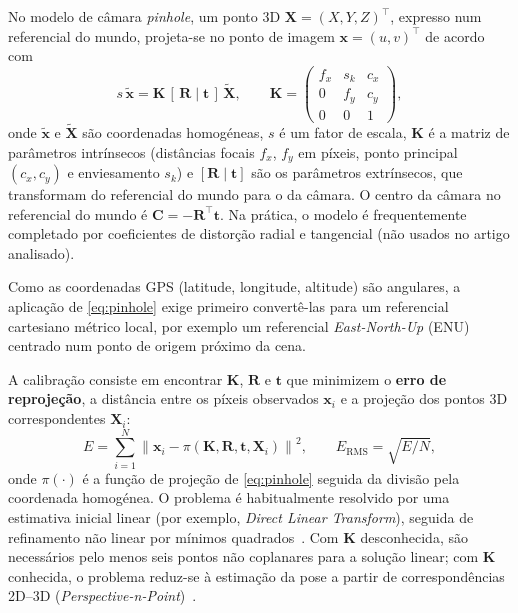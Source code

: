 No modelo de câmara \textit{pinhole}, um ponto 3D $\mathbf{X}=(X,Y,Z)^{\top}$, expresso num referencial do mundo, projeta-se no ponto de imagem $\mathbf{x}=(u,v)^{\top}$ de acordo com
\begin{equation}
    s\,\tilde{\mathbf{x}} = \mathbf{K}\,[\,\mathbf{R}\mid\mathbf{t}\,]\,\tilde{\mathbf{X}},
    \qquad
    \mathbf{K}=
    \begin{pmatrix}
        f_x & s_k & c_x\\
        0 & f_y & c_y\\
        0 & 0 & 1
    \end{pmatrix},
    \label{eq:pinhole}
\end{equation}
onde $\tilde{\mathbf{x}}$ e $\tilde{\mathbf{X}}$ são coordenadas homogéneas, $s$ é um fator de escala, $\mathbf{K}$ é a matriz de parâmetros intrínsecos (distâncias focais $f_x$, $f_y$ em píxeis, ponto principal $(c_x,c_y)$ e enviesamento $s_k$) e $[\mathbf{R}\mid\mathbf{t}]$ são os parâmetros extrínsecos, que transformam do referencial do mundo para o da câmara. O centro da câmara no referencial do mundo é $\mathbf{C}=-\mathbf{R}^{\top}\mathbf{t}$. Na prática, o modelo é frequentemente completado por coeficientes de distorção radial e tangencial (não usados no artigo analisado).

Como as coordenadas GPS (latitude, longitude, altitude) são angulares, a aplicação de \eqref{eq:pinhole} exige primeiro convertê-las para um referencial cartesiano métrico local, por exemplo um referencial \textit{East-North-Up} (ENU) centrado num ponto de origem próximo da cena.

A calibração consiste em encontrar $\mathbf{K}$, $\mathbf{R}$ e $\mathbf{t}$ que minimizem o \textbf{erro de reprojeção}, a distância entre os píxeis observados $\mathbf{x}_i$ e a projeção dos pontos 3D correspondentes $\mathbf{X}_i$:
\begin{equation}
    E=\sum_{i=1}^{N}\left\lVert \mathbf{x}_i-\pi\!\left(\mathbf{K},\mathbf{R},\mathbf{t},\mathbf{X}_i\right)\right\rVert^{2},
    \qquad
    E_{\mathrm{RMS}}=\sqrt{E/N},
    \label{eq:reproj}
\end{equation}
onde $\pi(\cdot)$ é a função de projeção de \eqref{eq:pinhole} seguida da divisão pela coordenada homogénea. O problema é habitualmente resolvido por uma estimativa inicial linear (por exemplo, \textit{Direct Linear Transform}), seguida de refinamento não linear por mínimos quadrados~\cite{hartley2004mvg}. Com $\mathbf{K}$ desconhecida, são necessários pelo menos seis pontos não coplanares para a solução linear; com $\mathbf{K}$ conhecida, o problema reduz-se à estimação da pose a partir de correspondências 2D--3D (\textit{Perspective-n-Point})~\cite{hartley2004mvg}.

